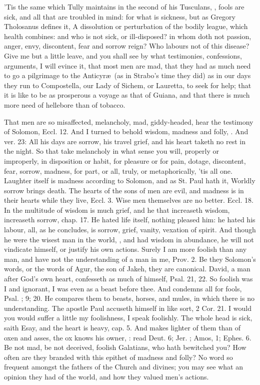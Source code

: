 {'Tis the same which Tully maintains in the second of his Tusculans,
, fools are
sick, and all that are troubled in mind: for what is sickness, but as
Gregory Tholosanus defines it, A dissolution or perturbation of
the bodily league, which health combines: and who is not sick, or
ill-disposed? in whom doth not passion, anger, envy, discontent, fear
and sorrow reign? Who labours not of this disease? Give me but a little
leave, and you shall see by what testimonies, confessions, arguments, I
will evince it, that most men are mad, that they had as much need to go
a pilgrimage to the Anticyr\ae{}\ (as in Strabo's time they did) as in
our days they run to Compostella, our Lady of Sichem, or Lauretta, to
seek for help; that it is like to be as prosperous a voyage as that of
Guiana, and that there is much more need of hellebore than of tobacco.

That men are so misaffected, melancholy, mad, giddy-headed, hear the
testimony of Solomon, Eccl.  12. And I turned to behold wisdom,
madness and folly, \etc. And ver. 23: All his days are sorrow, his travel
grief, and his heart taketh no rest in the night. So that take
melancholy in what sense you will, properly or improperly, in
disposition or habit, for pleasure or for pain, dotage, discontent,
fear, sorrow, madness, for part, or all, truly, or metaphorically, 'tis
all one. Laughter itself is madness according to Solomon, and as St.
Paul hath it, Worldly sorrow brings death. The hearts of the sons of
men are evil, and madness is in their hearts while they live, Eccl. 
3. Wise men themselves are no better. Eccl.  18. In the multitude of
wisdom is much grief, and he that increaseth wisdom, increaseth sorrow,
chap.  17. He hated life itself, nothing pleased him: he hated his
labour, all, as he concludes, is sorrow, grief, vanity, vexation
of spirit. And though he were the wisest man in the world, , and had wisdom in abundance, he will not vindicate himself,
or justify his own actions. Surely I am more foolish than any man, and
have not the understanding of a man in me, Prov.  2. Be they
Solomon's words, or the words of Agur, the son of Jakeh, they are
canonical. David, a man after God's own heart, confesseth as much of
himself, Psal.  21, 22. So foolish was I and ignorant, I was
even as a beast before thee. And condemns all for fools, Psal. ;
 9;  20. He compares them to beasts, horses, and mules, in
which there is no understanding. The apostle Paul accuseth himself in
like sort, 2 Cor.  21. I would you would suffer a little my
foolishness, I speak foolishly. The whole head is sick, saith Esay, and
the heart is heavy, cap.  5. And makes lighter of them than of oxen
and asses, the ox knows his owner, \etc: read Deut.  6; Jer. ;
Amos,  1; Ephes.  6. Be not mad, be not deceived, foolish
Galatians, who hath bewitched you? How often are they branded with this
epithet of madness and folly? No word so frequent amongst the fathers
of the Church and divines; you may see what an opinion they had of the
world, and how they valued men's actions.

}
